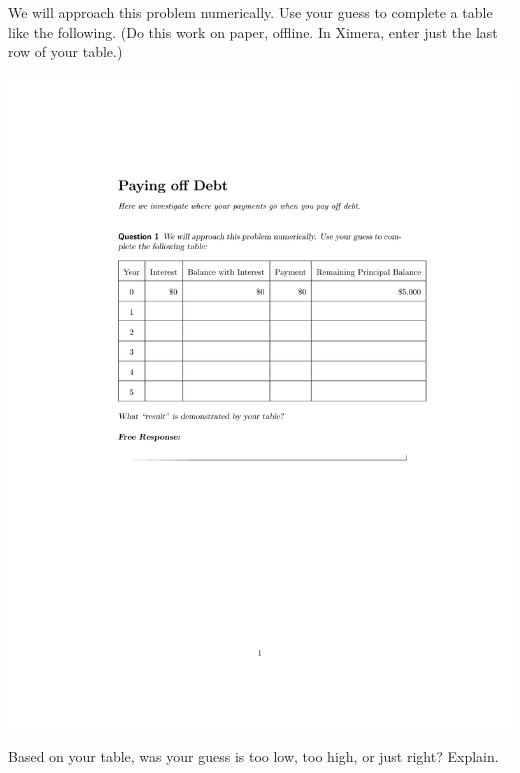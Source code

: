 \documentclass[handout,space,nooutcomes]{ximera}
\begin{document}
\begin{question}[0in]
We will approach this problem numerically.  Use your guess to complete a table like the following.  (Do this work on paper, offline.  In Ximera, enter just the last row of your table.)  
\begin{image}
\includegraphics{payingOffDebtTableGraphic.pdf}
\end{image}
\begin{freeResponse}
\end{freeResponse}
\end{question}

\begin{question}
Based on your table, was your guess is too low, too high, or just right?  Explain.  
\begin{freeResponse}
\end{freeResponse}
\end{question}
\end{document}
